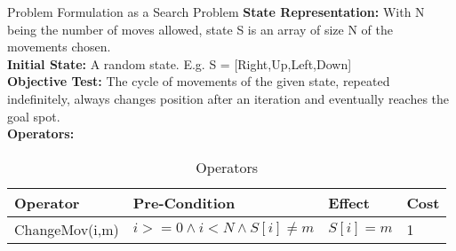 

\begin{frame}{Problem Formulation as a Search Problem}
    \textbf{State Representation:} With N being the number of moves allowed, state S is an array of size N of the movements chosen. \\
    \textbf{Initial State:} A random state. E.g. S = [Right,Up,Left,Down] \\
    \textbf{Objective Test:} The cycle of movements of the given state, repeated indefinitely, always changes position after an iteration and eventually reaches the goal spot. \\
    \textbf{Operators:}
    \begin{table}
        \begin{tabular}{l l l l}
            \toprule
            \textbf{Operator} & \textbf{Pre-Condition} & \textbf{Effect} & \textbf{Cost} \\
            \midrule
            ChangeMov(i,m)  & $ i >= 0 \land i < N \land S[i] \neq m $ & $S[i] = m $  & 1 \\
            \bottomrule
        \end{tabular}
        \caption{Operators}
    \end{table}
\end{frame}

